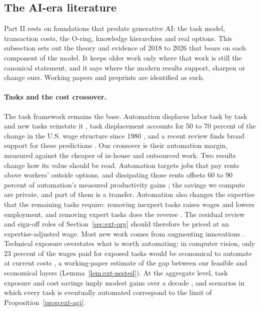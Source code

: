 \subsection{The AI-era literature}\label{sec:lit-modern}

Part II rests on foundations that predate generative AI: the task model, transaction costs, the O-ring, knowledge hierarchies and real options. This subsection sets out the theory and evidence of 2018 to 2026 that bears on each component of the model. It keeps older work only where that work is still the canonical statement, and it says where the modern results support, sharpen or change ours. Working papers and preprints are identified as such.

\paragraph{Tasks and the cost crossover.} The task framework remains the base. Automation displaces labor task by task and new tasks reinstate it \citep{acemoglu2018race,acemoglu2019automation}, task displacement accounts for 50 to 70 percent of the change in the U.S. wage structure since 1980 \citep{acemoglu2022tasks}, and a recent review finds broad support for these predictions \citep{restrepo2024automation}. Our crossover is their automation margin, measured against the cheaper of in-house and outsourced work. Two results change how its value should be read. Automation targets jobs that pay rents above workers' outside options, and dissipating those rents offsets 60 to 90 percent of automation's measured productivity gains \citep{acemoglu2026automation}; the savings we compute are private, and part of them is a transfer. Automation also changes the expertise that the remaining tasks require: removing inexpert tasks raises wages and lowers employment, and removing expert tasks does the reverse \citep{autor2025expertise}. The residual review and sign-off roles of Section~\ref{sec:ext-org} should therefore be priced at an expertise-adjusted wage. Most new work comes from augmenting innovations \citep{autor2024new}. Technical exposure overstates what is worth automating: in computer vision, only 23 percent of the wages paid for exposed tasks would be economical to automate at current costs \citep{svanberg2024beyond}, a working-paper estimate of the gap between our feasible and economical layers (Lemma~\ref{lem:ext-nested}). At the aggregate level, task exposure and cost savings imply modest gains over a decade \citep{acemoglu2025simple}, and scenarios in which every task is eventually automated \citep{korinek2024scenarios} correspond to the limit of Proposition~\ref{prop:ext-agi}.

